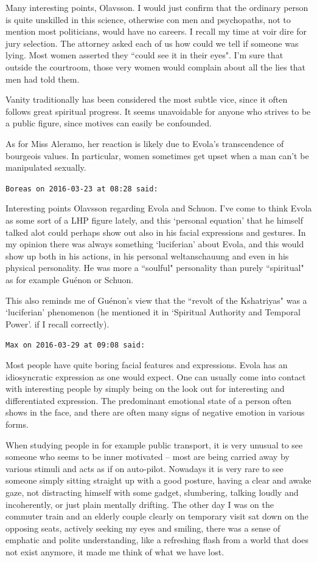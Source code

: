 \begin{footnotesize}
\begin{sffamily}
Many interesting points, Olavsson. I would just confirm that the ordinary person is quite unskilled in this science, otherwise con men and psychopaths, not to mention most politicians, would have no careers. I recall my time at voir dire for jury selection. The attorney asked each of us how could we tell if someone was lying. Most women asserted they ``could see it in their eyes". I'm sure that outside the courtroom, those very women would complain about all the lies that men had told them.

Vanity traditionally has been considered the most subtle vice, since it often follows great spiritual progress. It seems unavoidable for anyone who strives to be a public figure, since motives can easily be confounded.

As for Miss Aleramo, her reaction is likely due to Evola's transcendence of bourgeois values. In particular, women sometimes get upset when a man can't be manipulated sexually.


\hfill

\texttt{Boreas on 2016-03-23 at 08:28 said: }

Interesting points Olavsson regarding Evola and Schuon. I've come to think Evola as some sort of a LHP figure lately, and this `personal equation' that he himself talked alot could perhaps show out also in his facial expressions and gestures. In my opinion there was always something `luciferian' about Evola, and this would show up both in his actions, in his personal weltanschauung and even in his physical personality. He was more a ``soulful" personality than purely ``spiritual" as for example Guénon or Schuon.

This also reminds me of Guénon's view that the ``revolt of the Kshatriyas" was a `luciferian' phenomenon (he mentioned it in `Spiritual Authority and Temporal Power'. if I recall correctly).


\hfill

\texttt{Max on 2016-03-29 at 09:08 said: }

Most people have quite boring facial features and expressions. Evola has an idiosyncratic expression as one would expect. One can usually come into contact with interesting people by simply being on the look out for interesting and differentiated expression. The predominant emotional state of a person often shows in the face, and there are often many signs of negative emotion in various forms. 

When studying people in for example public transport, it is very unusual to see someone who seems to be inner motivated – most are being carried away by various stimuli and acts as if on auto-pilot. Nowadays it is very rare to see someone simply sitting straight up with a good posture, having a clear and awake gaze, not distracting himself with some gadget, slumbering, talking loudly and incoherently, or just plain mentally drifting. The other day I was on the commuter train and an elderly couple clearly on temporary visit sat down on the opposing seats, actively seeking my eyes and smiling, there was a sense of emphatic and polite understanding, like a refreshing flash from a world that does not exist anymore, it made me think of what we have lost.



\end{sffamily}
\end{footnotesize}
